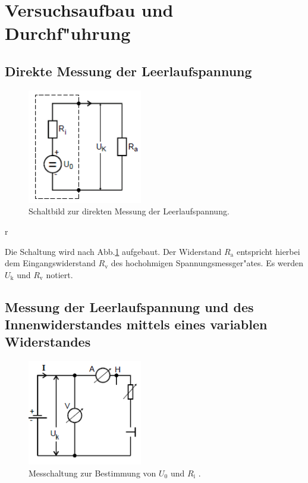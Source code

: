 \section{Versuchsaufbau und Durchf"uhrung} %
\label{sec:durchfuehrung}

\subsection{Direkte Messung der Leerlaufspannung} %
\label{sub:direkte_messung_der_leerlaufspannung}

\begin{figure}
	\centering
	\includegraphics[width = 5cm]{img/Monozelle.PNG}
	\caption{Schaltbild zur direkten Messung der Leerlaufspannung. \cite{anleitung}}
	\label{aufgabea}
\end{figure}{r}

Die Schaltung wird nach Abb.\ref{aufgabea} aufgebaut. Der Widerstand $R_\mathrm{a}$ entspricht hierbei dem Eingangswiderstand $R_\mathrm{v}$ des hochohmigen Spannungsmessger"ates.
Es werden $U_\mathrm{k}$ und $R_\mathrm{v}$ notiert.

\newpage

\subsection{Messung der Leerlaufspannung und des Innenwiderstandes mittels eines variablen Widerstandes} %
\label{sub:messung_der_leerlaufspannung_mittels_eines_variablen_widerstandes_}

\begin{figure}
	\centering
	\includegraphics[width = 5cm]{img/b.PNG}
	\caption{Messchaltung zur Bestimmung von $U_\mathrm{0}$ und $R_\mathrm{i}$ \cite{anleitung}.}
	\label{aufgabeb}
\end{figure}

